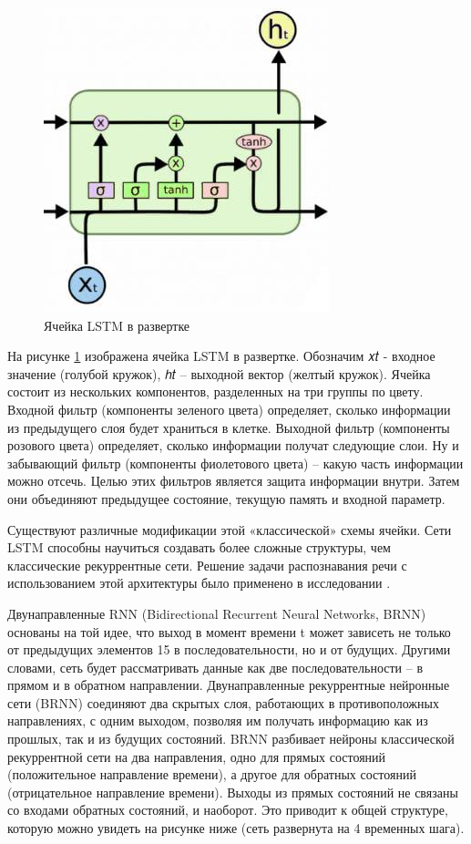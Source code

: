 \begin{figure}[h]
\includegraphics[width=0.75\columnwidth]{./img/recur_3.jpg}
\centering
\caption{Ячейка LSTM в развертке}
\label{pic:recur_3}
\end{figure}

На рисунке \ref{pic:recur_3} изображена ячейка LSTM в развертке. Обозначим 𝑥𝑡 - входное значение (голубой кружок), 
ℎ𝑡 – выходной вектор (желтый кружок). Ячейка состоит из нескольких компонентов, разделенных на три группы по цвету. 
Входной фильтр (компоненты зеленого цвета) определяет, сколько информации из предыдущего слоя будет храниться в клетке. 
Выходной фильтр (компоненты розового цвета) определяет, сколько информации получат следующие слои. 
Ну и забывающий фильтр (компоненты фиолетового цвета) – какую часть информации можно отсечь. 
Целью этих фильтров является защита информации внутри. 
Затем они объединяют предыдущее состояние, текущую память и входной параметр. 

Существуют различные модификации этой «классической» схемы ячейки. 
Сети LSTM способны научиться создавать более сложные структуры, чем классические рекуррентные сети. 
Решение задачи распознавания речи с использованием этой архитектуры было применено в исследовании \cite{2_recur}.

Двунаправленные RNN (Bidirectional Recurrent Neural Networks, BRNN) основаны на той идее, что выход в момент времени t может зависеть не только от предыдущих элементов
15 в последовательности, но и от будущих. Другими словами, сеть будет рассматривать данные как две последовательности – в прямом и в обратном направлении.
Двунаправленные рекуррентные нейронные сети (BRNN) соединяют два скрытых слоя, работающих в противоположных направлениях, 
с одним выходом, позволяя им получать информацию как из прошлых, так и из будущих состояний. 
BRNN разбивает нейроны классической рекуррентной сети на два направления, 
одно для прямых состояний (положительное направление времени), а другое для обратных состояний (отрицательное направление времени). 
Выходы из прямых состояний не связаны со входами обратных состояний, и наоборот. 
Это приводит к общей структуре, которую можно увидеть на рисунке ниже (сеть развернута на 4 временных шага).


